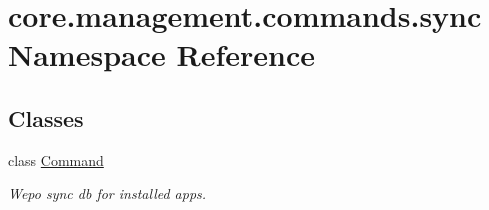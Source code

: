 \hypertarget{namespacecore_1_1management_1_1commands_1_1sync}{\section{core.\-management.\-commands.\-sync Namespace Reference}
\label{namespacecore_1_1management_1_1commands_1_1sync}
}
\subsection*{Classes}
\begin{DoxyCompactItemize}
\item 
class \hyperlink{classcore_1_1management_1_1commands_1_1sync_1_1Command}{Command}
\begin{DoxyCompactList}\small\item\em Wepo sync db for installed apps. \end{DoxyCompactList}\end{DoxyCompactItemize}
